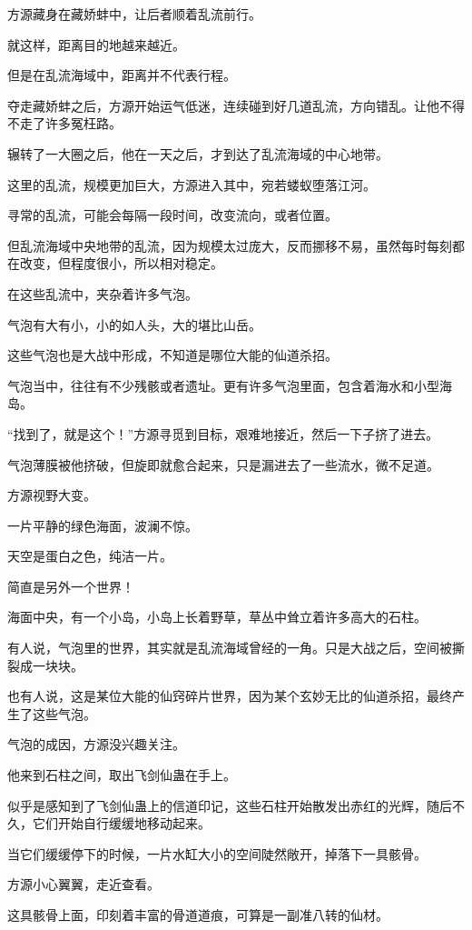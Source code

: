 \begin{this_body}
方源藏身在藏娇蚌中，让后者顺着乱流前行。

就这样，距离目的地越来越近。

但是在乱流海域中，距离并不代表行程。

夺走藏娇蚌之后，方源开始运气低迷，连续碰到好几道乱流，方向错乱。让他不得不走了许多冤枉路。

辗转了一大圈之后，他在一天之后，才到达了乱流海域的中心地带。

这里的乱流，规模更加巨大，方源进入其中，宛若蝼蚁堕落江河。

寻常的乱流，可能会每隔一段时间，改变流向，或者位置。

但乱流海域中央地带的乱流，因为规模太过庞大，反而挪移不易，虽然每时每刻都在改变，但程度很小，所以相对稳定。

在这些乱流中，夹杂着许多气泡。

气泡有大有小，小的如人头，大的堪比山岳。

这些气泡也是大战中形成，不知道是哪位大能的仙道杀招。

气泡当中，往往有不少残骸或者遗址。更有许多气泡里面，包含着海水和小型海岛。

“找到了，就是这个！”方源寻觅到目标，艰难地接近，然后一下子挤了进去。

气泡薄膜被他挤破，但旋即就愈合起来，只是漏进去了一些流水，微不足道。

方源视野大变。

一片平静的绿色海面，波澜不惊。

天空是蛋白之色，纯洁一片。

简直是另外一个世界！

海面中央，有一个小岛，小岛上长着野草，草丛中耸立着许多高大的石柱。

有人说，气泡里的世界，其实就是乱流海域曾经的一角。只是大战之后，空间被撕裂成一块块。

也有人说，这是某位大能的仙窍碎片世界，因为某个玄妙无比的仙道杀招，最终产生了这些气泡。

气泡的成因，方源没兴趣关注。

他来到石柱之间，取出飞剑仙蛊在手上。

似乎是感知到了飞剑仙蛊上的信道印记，这些石柱开始散发出赤红的光辉，随后不久，它们开始自行缓缓地移动起来。

当它们缓缓停下的时候，一片水缸大小的空间陡然敞开，掉落下一具骸骨。

方源小心翼翼，走近查看。

这具骸骨上面，印刻着丰富的骨道道痕，可算是一副准八转的仙材。


\end{this_body}
